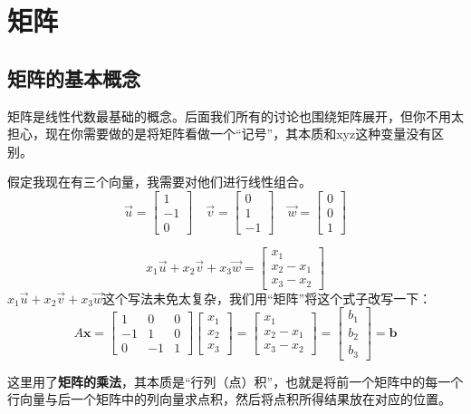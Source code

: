 \chapter{矩阵}
\section{矩阵的基本概念}
矩阵是线性代数最基础的概念。后面我们所有的讨论也围绕矩阵展开，但你不用太担心，现在你需要做的是将矩阵看做一个“记号”，其本质和xyz这种变量没有区别。

假定我现在有三个向量，我需要对他们进行线性组合。
$$
\vec u=\begin{bmatrix}1\\-1\\0\end{bmatrix}\quad
\vec v=\begin{bmatrix}0\\1\\-1\end{bmatrix}\quad
\vec w=\begin{bmatrix}0\\0\\1\end{bmatrix}
$$

$$
x_1\vec u+x_2\vec v+x_3\vec w=\begin{bmatrix}x_1\\x_2-x_1\\x_3-x_2\end{bmatrix}
$$
$x_1\vec u+x_2\vec v+x_3\vec w$这个写法未免太复杂，我们用“矩阵”将这个式子改写一下：
$$
A\mathbf x=\begin{bmatrix}1 & 0 & 0\\-1 & 1 & 0\\0 & -1 & 1\end{bmatrix}\begin{bmatrix}x_1\\x_2\\x_3\end{bmatrix}=\begin{bmatrix}x_1\\x_2-x_1\\x_3-x_2\end{bmatrix}=\begin{bmatrix}b_1\\b_2\\b_3\end{bmatrix}=\mathbf b
$$

这里用了\textbf{矩阵的乘法}，其本质是“行列（点）积”，也就是将前一个矩阵中的每一个行向量与后一个矩阵中的列向量求点积，然后将点积所得结果放在对应的位置。

